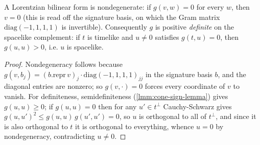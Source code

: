 \begin{lemma}
    \label{lmm:spacelike-complement-definite}
    \leanok
    A Lorentzian bilinear form is nondegenerate: if $g(v,w) = 0$ for every $w$, then $v = 0$ (this is read off the signature basis, on which the Gram matrix $\mathrm{diag}(-1,1,1,1)$ is invertible). Consequently $g$ is positive \emph{definite} on the spacelike complement: if $t$ is timelike and $u \ne 0$ satisfies $g(t,u) = 0$, then $g(u,u) > 0$, i.e. $u$ is spacelike.
\end{lemma}
\begin{proof}
    \leanok
    Nondegeneracy follows because $g(v, b_j) = (b.\mathrm{repr}\,v)_j \cdot \mathrm{diag}(-1,1,1,1)_{jj}$ in the signature basis $b$, and the diagonal entries are nonzero; so $g(v, \cdot) = 0$ forces every coordinate of $v$ to vanish. For definiteness, semidefiniteness (\ref{lmm:cone-sign-lemma}) gives $g(u,u) \ge 0$; if $g(u,u) = 0$ then for any $u' \in t^\perp$ Cauchy-Schwarz gives $g(u,u')^2 \le g(u,u)\,g(u',u') = 0$, so $u$ is orthogonal to all of $t^\perp$, and since it is also orthogonal to $t$ it is orthogonal to everything, whence $u = 0$ by nondegeneracy, contradicting $u \ne 0$.
\end{proof}


